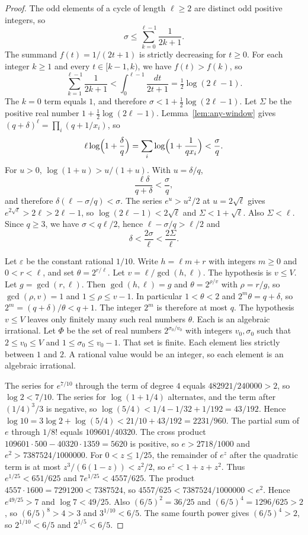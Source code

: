 \documentclass[11pt]{article}
\begin{document}
\begin{proof}
The odd elements of a cycle of length $\ell \ge 2$ are distinct odd positive integers, so
\[
\sigma \le \sum_{k=0}^{\ell-1} \frac{1}{2k+1}.
\]
The summand $f(t) = 1/(2t+1)$ is strictly decreasing for $t \ge 0$.
For each integer $k \ge 1$ and every $t \in [k-1,k)$, we have $f(t) > f(k)$, so
\[
\sum_{k=1}^{\ell-1} \frac{1}{2k+1} < \int_0^{\ell-1} \frac{dt}{2t+1} = \tfrac12\log(2\ell-1).
\]
The $k = 0$ term equals $1$, and therefore $\sigma < 1 + \tfrac12\log(2\ell-1)$.
Let $\Sigma$ be the positive real number $1 + \tfrac12\log(2\ell-1)$.
Lemma~\ref{lem:any-window} gives $(q+\delta)^\ell = \prod_i(q + 1/x_i)$, so
\[
\ell\log\Bigl(1 + \frac{\delta}{q}\Bigr) = \sum_i \log\Bigl(1 + \frac{1}{q x_i}\Bigr) < \frac{\sigma}{q}.
\]
For $u > 0$, $\log(1+u) > u/(1+u)$.
With $u = \delta/q$,
\[
\frac{\ell\delta}{q+\delta} < \frac{\sigma}{q},
\]
and therefore $\delta(\ell - \sigma/q) < \sigma$.
The series $e^u > u^2/2$ at $u = 2\sqrt{\ell}$ gives $e^{2\sqrt{\ell}} > 2\ell > 2\ell-1$, so $\log(2\ell-1) < 2\sqrt{\ell}$ and $\Sigma < 1 + \sqrt{\ell}$.
Also $\Sigma < \ell$.
Since $q \ge 3$, we have $\sigma < q\ell/2$, hence $\ell - \sigma/q > \ell/2$ and
\[
\delta < \frac{2\sigma}{\ell} < \frac{2\Sigma}{\ell}.
\]

Let $\varepsilon$ be the constant rational $1/10$.
Write $h = \ell m + r$ with integers $m \ge 0$ and $0 < r < \ell$, and set $\theta = 2^{r/\ell}$.
Let $v = \ell/\gcd(h,\ell)$.
The hypothesis is $v \le V$.
Let $g = \gcd(r,\ell)$.
Then $\gcd(h,\ell) = g$ and $\theta = 2^{\rho/v}$ with $\rho = r/g$, so $\gcd(\rho,v) = 1$ and $1 \le \rho \le v-1$.
In particular $1 < \theta < 2$ and $2^m\theta = q+\delta$, so $2^m = (q+\delta)/\theta < q+1$.
The integer $2^m$ is therefore at most $q$.
The hypothesis $v \le V$ leaves only finitely many such real numbers $\theta$.
Each is an algebraic irrational.
Let $\Phi$ be the set of real numbers $2^{\sigma_0/v_0}$ with integers $v_0,\sigma_0$ such that $2 \le v_0 \le V$ and $1 \le \sigma_0 \le v_0-1$.
That set is finite.
Each element lies strictly between $1$ and $2$.
A rational value would be an integer, so each element is an algebraic irrational.

The series for $e^{7/10}$ through the term of degree $4$ equals $482921/240000 > 2$, so $\log 2 < 7/10$.
The series for $\log(1+1/4)$ alternates, and the term after $(1/4)^3/3$ is negative, so $\log(5/4) < 1/4 - 1/32 + 1/192 = 43/192$.
Hence $\log 10 = 3\log 2 + \log(5/4) < 21/10 + 43/192 = 2231/960$.
The partial sum of $e$ through $1/8!$ equals $109601/40320$.
The cross product $109601 \cdot 500 - 40320 \cdot 1359 = 5620$ is positive, so $e > 2718/1000$ and $e^2 > 7387524/1000000$.
For $0 < z \le 1/25$, the remainder of $e^z$ after the quadratic term is at most $z^3/(6(1-z)) < z^2/2$, so $e^z < 1 + z + z^2$.
Thus $e^{1/25} < 651/625$ and $7e^{1/25} < 4557/625$.
The product $4557 \cdot 1600 = 7291200 < 7387524$, so $4557/625 < 7387524/1000000 < e^2$.
Hence $e^{49/25} > 7$ and $\log 7 < 49/25$.
Also $(6/5)^2 = 36/25$ and $(6/5)^4 = 1296/625 > 2$, so $(6/5)^8 > 4 > 3$ and $3^{1/10} < 6/5$.
The same fourth power gives $(6/5)^4 > 2$, so $2^{1/10} < 6/5$ and $2^{1/5} < 6/5$.


\end{proof}
\end{document}
